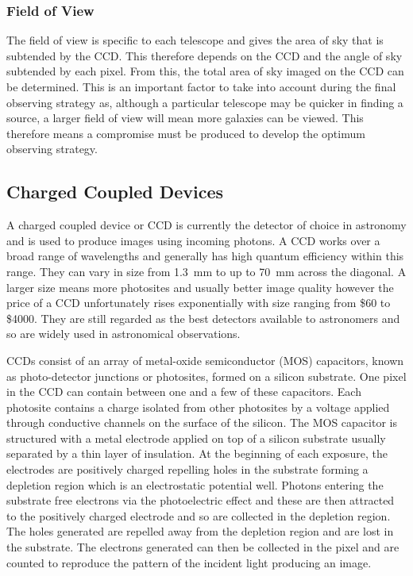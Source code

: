 		\subsubsection{Field of View} %
		\label{ssub:field_of_view}
			The field of view is specific to each telescope and gives the area of sky that is subtended by the CCD. This therefore depends on the CCD and the angle of sky subtended by each pixel. From this, the total area of sky imaged on the CCD can be determined. This is an important factor to take into account during the final observing strategy as, although a particular telescope may be quicker in finding a source, a larger field of view will mean more galaxies can be viewed. This therefore means a compromise must be produced to develop the optimum observing strategy.

	\subsection{Charged Coupled Devices} %
	\label{sub:charged_coupled_devices}
		A charged coupled device or CCD is currently the detector of choice in astronomy and is used to produce images using incoming photons. A CCD works over a broad range of wavelengths and generally has high quantum efficiency within this range. They can vary in size from \SI{1.3}{\milli\metre} to up to \SI{70}{\milli\metre} across the diagonal. A larger size means more photosites and usually better image quality however the price of a CCD unfortunately rises exponentially with size ranging from \$60 to \$4000. They are still regarded as the best detectors available to astronomers and so are widely used in astronomical observations.

		CCDs consist of an array of metal-oxide semiconductor (MOS) capacitors, known as photo-detector junctions or photosites, formed on a silicon substrate. One pixel in the CCD can contain between one and a few of these capacitors. Each photosite contains a charge isolated from other photosites by a voltage applied through conductive channels on the surface of the silicon\cite{Diffraction_Limited_Imaging_Saha}. The MOS capacitor is structured with a metal electrode applied on top of a silicon substrate usually separated by a thin layer of insulation. At the beginning of each exposure, the electrodes are positively charged repelling holes in the substrate forming a depletion region which is an electrostatic potential well. Photons entering the substrate free electrons via the photoelectric effect and these are then attracted to the positively charged electrode and so are collected in the depletion region. The holes generated are repelled away from the depletion region and are lost in the substrate. The electrons generated can then be collected in the pixel and are counted to reproduce the pattern of the incident light producing an image.

